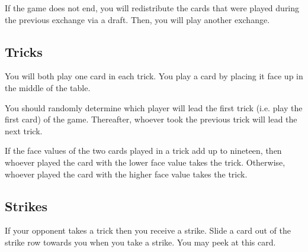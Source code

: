 \documentclass[a6paper, parskip=half, DIV=14, 10pt]{scrartcl}
\newcommand{\card}[1]{{\setmainfont{Roboto Slab} #1}}
\begin{document}
If the game does not end, you will redistribute the cards that were played during the previous exchange via a draft. Then, you will play another exchange.


%

\subsection*{Tricks}
You will both play one card in each trick. You play a card by placing it face up in the middle of the table.

You should randomly determine which player will lead the first trick (i.e. play the first card) of the game. Thereafter, whoever took the previous trick will lead the next trick.

If the face values of the two cards played in a trick add up to nineteen, then whoever played the card with the lower face value takes the trick. Otherwise, whoever played the card with the higher face value takes the trick.

%
%

\newpage

\subsection*{Strikes}
If your opponent takes a trick then you receive a strike. Slide a card out of the strike row towards you when you take a strike. You may peek at this card.
\end{document}
